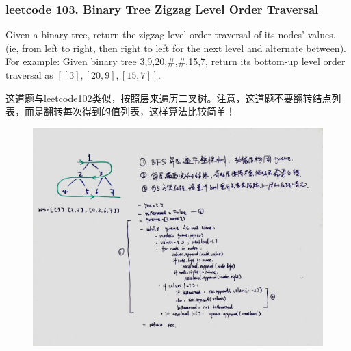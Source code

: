 \documentclass[a4paper,10pt]{article}
\begin{document}
\subsubsection{leetcode 103. Binary Tree Zigzag Level Order Traversal}
Given a binary tree, return the zigzag level order traversal of its nodes' values. (ie, from left to right, then right to left for the next level and alternate between). \\

\noindent For example: Given binary tree {3,9,20,#,#,15,7}, return its bottom-up level order traversal as $ [[3],[20,9],[15,7]] $. \\

\begin{CJK*}{UTF8}{gbsn}
\noindent 这道题与leetcode102类似，按照层来遍历二叉树。注意，这道题不要翻转结点列表，而是翻转每次得到的值列表，这样算法比较简单！
\end{CJK*}

\begin{figure}[h]
    \includegraphics[width=\textwidth]{leetcode103.jpg}
    \centering \\
\end{figure}
\end{document}
